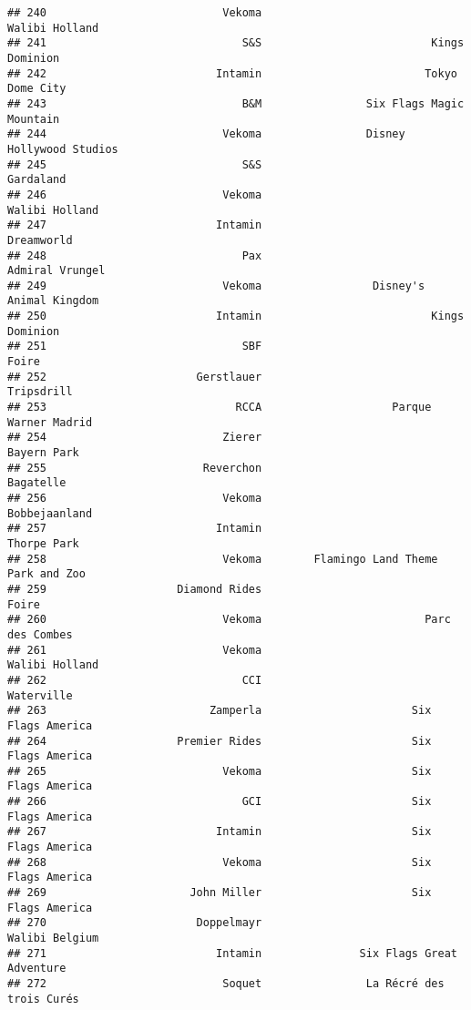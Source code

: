 \documentclass[
]{article}
\begin{document}
\begin{verbatim}
## 240                           Vekoma                          Walibi Holland
## 241                              S&S                          Kings Dominion
## 242                          Intamin                         Tokyo Dome City
## 243                              B&M                Six Flags Magic Mountain
## 244                           Vekoma                Disney Hollywood Studios
## 245                              S&S                               Gardaland
## 246                           Vekoma                          Walibi Holland
## 247                          Intamin                              Dreamworld
## 248                              Pax                         Admiral Vrungel
## 249                           Vekoma                 Disney's Animal Kingdom
## 250                          Intamin                          Kings Dominion
## 251                              SBF                                   Foire
## 252                       Gerstlauer                              Tripsdrill
## 253                             RCCA                    Parque Warner Madrid
## 254                           Zierer                             Bayern Park
## 255                        Reverchon                               Bagatelle
## 256                           Vekoma                           Bobbejaanland
## 257                          Intamin                             Thorpe Park
## 258                           Vekoma        Flamingo Land Theme Park and Zoo
## 259                    Diamond Rides                                   Foire
## 260                           Vekoma                         Parc des Combes
## 261                           Vekoma                          Walibi Holland
## 262                              CCI                              Waterville
## 263                         Zamperla                       Six Flags America
## 264                    Premier Rides                       Six Flags America
## 265                           Vekoma                       Six Flags America
## 266                              GCI                       Six Flags America
## 267                          Intamin                       Six Flags America
## 268                           Vekoma                       Six Flags America
## 269                      John Miller                       Six Flags America
## 270                       Doppelmayr                          Walibi Belgium
## 271                          Intamin               Six Flags Great Adventure
## 272                           Soquet                La Récré des trois Curés

\end{verbatim}
\end{document}
